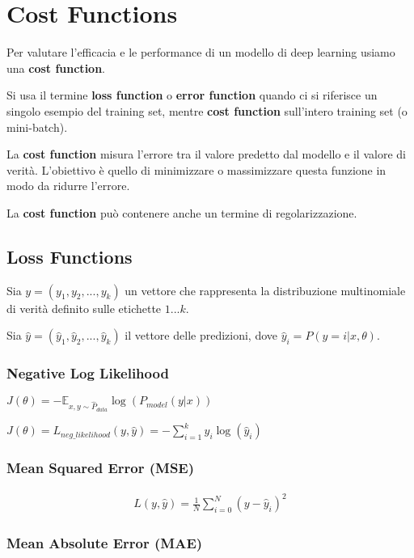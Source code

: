 \chapter{Cost Functions}
Per valutare l'efficacia e le performance di un modello di deep learning usiamo una \textbf{cost function}.

Si usa il termine \textbf{loss function} o \textbf{error function} quando ci si riferisce un singolo esempio del training set,
mentre \textbf{cost function} sull'intero training set (o mini-batch).

La \textbf{cost function} misura l'errore tra il valore predetto dal modello e il valore di verità. 
L'obiettivo è quello di minimizzare o massimizzare questa funzione in modo da ridurre l'errore.

La \textbf{cost function} può contenere anche un termine di regolarizzazione.

\section{Loss Functions}
Sia $y = (y_1, y_2, ..., y_k)$ un vettore che rappresenta la distribuzione multinomiale di verità definito sulle etichette $1...k$.

Sia $\hat{y} = (\hat{y}_1, \hat{y}_2, ..., \hat{y}_k)$ il vettore delle predizioni, dove $\hat{y}_i = P(y = i | x, \theta)$.

\subsection*{Negative Log Likelihood}

$J(\theta) = -\mathbb{E}_{x, y \sim \hat{P}_{data}} \log(P_{model}(y | x))$

$J(\theta) = L_{neg\_likelihood}(y, \hat{y}) = - \sum_{i = 1}^k y_i \log (\hat{y}_i)$

\subsection*{Mean Squared Error (MSE)}

\begin{align*}
  L(y, \hat{y}) = \frac{1}{N} \sum_{i = 0}^N {(y - \hat{y}_i)^2}
\end{align*}

\subsection*{Mean Absolute Error (MAE)}

